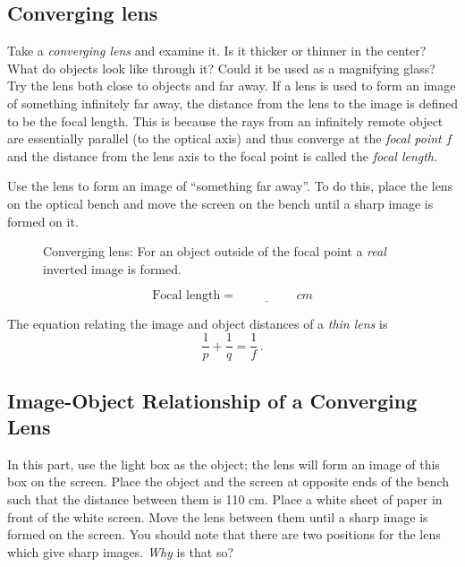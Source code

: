 \documentclass[11pt, a4paper]{article}
\begin{document}
\subsection{Converging lens}
Take a \textit{converging lens} and examine it.
Is it thicker or thinner in the center?
What do objects look like through it?
Could it be used as a magnifying glass?
Try the lens both close to objects and far away.
\fillwithlines{3cm}
If a lens is used to form an image of something infinitely far away, the
distance from the lens to the image is defined to be the focal length. 
This is because the rays from an infinitely remote object are essentially
parallel (to the optical axis) and thus converge at the \textit{focal point} $f$
and the distance from the lens axis to the focal point is called the
\textit{focal length}.

Use the lens to form an image of “something far away”. 
To do this, place the lens on the optical bench and move the screen on the
bench until a sharp image is formed on it. 
\begin{figure}[tbh]
    \centering
    \def\svgwidth{\textwidth}
    
    \caption{Converging lens: For an object outside of the focal point a \textit{real}
    inverted image is formed.}
    \label{fig:convLens}
\end{figure}
\begin{equation*}
    \text{Focal length} = \underline{\hspace{2cm}}\si{cm}
\end{equation*}

The equation relating the image and object distances of a \textit{thin lens} is
\begin{equation}
    \frac{1}{p} + \frac{1}{q} = \frac{1}{f}\,.
    \label{eq:f}
\end{equation}

\subsection{Image-Object Relationship of a Converging Lens}
In this part, use the light box as the object; the lens will form an image of
this box on the screen.
Place the object and the screen at opposite ends of the bench such that the
distance between them is 110 cm.
Place a white sheet of paper in front of the white screen. 
Move the lens between them until a sharp image is formed on the screen.
You should note that there are two positions for the lens which give sharp
images. \textit{Why} is that so?
\fillwithlines{3cm}
\end{document}
